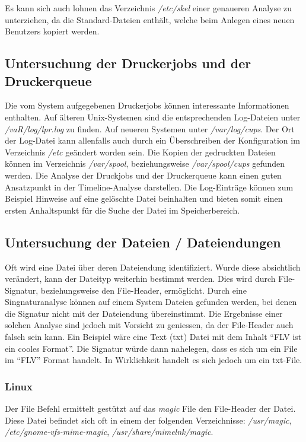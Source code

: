 Es kann sich auch lohnen das Verzeichnis \textit{/etc/skel} einer genaueren Analyse zu unterziehen, da die Standard-Dateien enthält, welche beim Anlegen eines neuen Benutzers kopiert werden.
	

\subsection{Untersuchung der Druckerjobs und der Druckerqueue}
Die vom System aufgegebenen Druckerjobs können interessante Informationen enthalten. Auf älteren Unix-Systemen sind die entsprechenden Log-Dateien unter \textit{/vaR/log/lpr.log} zu finden. Auf neueren Systemen unter \textit{/var/log/cups}. Der Ort der Log-Datei kann allenfalls auch durch ein Überschreiben der Konfiguration im Verzeichnis \textit{/etc} geändert worden sein. Die Kopien der gedruckten Dateien können im Verzeichnis \textit{/var/spool}, beziehungsweise \textit{/var/spool/cups} gefunden werden. Die Analyse der Druckjobs und der Druckerqueue kann einen guten Ansatzpunkt in der Timeline-Analyse darstellen. Die Log-Einträge können zum Beispiel Hinweise auf eine gelöschte Datei beinhalten und bieten somit einen ersten Anhaltspunkt für die Suche der Datei im Speicherbereich.



\subsection{Untersuchung der Dateien / Dateiendungen}
Oft wird eine Datei über deren Dateiendung identifiziert. Wurde diese absichtlich verändert, kann der Dateityp weiterhin bestimmt werden. Dies wird durch File-Signatur, beziehungsweise den File-Header, ermöglicht. Durch eine Singnaturanalyse können auf einem System Dateien gefunden werden, bei denen die Signatur nicht mit der Dateiendung übereinstimmt. Die Ergebnisse einer solchen Analyse sind jedoch mit Vorsicht zu geniessen, da der File-Header auch falsch sein kann. Ein Beispiel wäre eine Text (txt) Datei mit dem Inhalt "`FLV ist ein cooles Format"'. Die Signatur würde dann nahelegen, dass es sich um ein File im "`FLV"' Format handelt. In Wirklichkeit handelt es sich jedoch um ein txt-File.


\subsubsection{Linux}
Der File Befehl ermittelt gestützt auf das \textit{magic} File den File-Header der Datei. Diese Datei befindet sich oft in einem der folgenden Verzeichnisse: \textit{/usr/magic}, \textit{/etc/gnome-vfs-mime-magic}, \textit{/usr/share/mimelnk/magic}.

